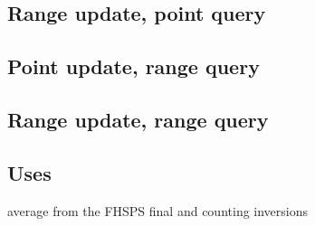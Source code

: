 
\subsection*{Range update, point query}



\subsection*{Point update, range query}



\subsection*{Range update, range query}



\subsection*{Uses}

average from the FHSPS final and counting inversions

\newpage